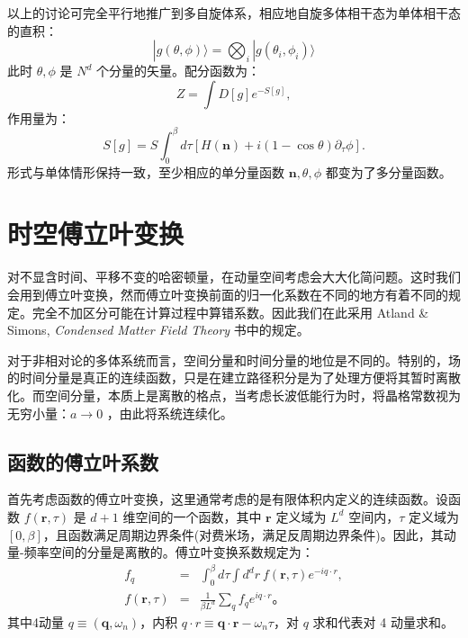 \documentclass[UTF8]{ctexart}
\begin{document}
以上的讨论可完全平行地推广到多自旋体系，相应地自旋多体相干态为单体相干态的直积：
\begin{equation}
	|g(\theta,\phi)\rangle = \bigotimes_i |g(\theta_i,\phi_i )\rangle
\end{equation}
此时 $\theta,\phi$ 是 $N^d$ 个分量的矢量。配分函数为：
\begin{equation}
	Z = \int D[g] e^{-S[g]},
\end{equation}
作用量为：
\begin{equation}
	S[g] = S\int_0^\beta d\tau \left[H(\bm n)+i(1-\cos\theta)\partial_\tau \phi \right].
\end{equation}
形式与单体情形保持一致，至少相应的单分量函数 $\bm n,\theta,\phi$ 都变为了多分量函数。




\section*{时空傅立叶变换}
\noindent 
对不显含时间、平移不变的哈密顿量，在动量空间考虑会大大化简问题。这时我们会用到傅立叶变换，然而傅立叶变换前面的归一化系数在不同的地方有着不同的规定。完全不加区分可能在计算过程中算错系数。因此我们在此采用 Atland \& Simons, \textit{Condensed Matter Field Theory} 书中的规定。

对于非相对论的多体系统而言，空间分量和时间分量的地位是不同的。特别的，场的时间分量是真正的连续函数，只是在建立路径积分是为了处理方便将其暂时离散化。而空间分量，本质上是离散的格点，当考虑长波低能行为时，将晶格常数视为无穷小量：$a \rightarrow 0$ ，由此将系统连续化。


\subsection*{函数的傅立叶系数}
\noindent 
首先考虑函数的傅立叶变换，这里通常考虑的是有限体积内定义的连续函数。设函数 $f(\bm r,\tau)$ 是 $d+1$ 维空间的一个函数，其中 $\bm r$ 定义域为 $L^d$ 空间内，$\tau$ 定义域为 $[0,\beta]$，且函数满足周期边界条件(对费米场，满足反周期边界条件)。因此，其动量-频率空间的分量是离散的。傅立叶变换系数规定为：
\begin{eqnarray}
	f_q &=& \int_0^\beta d\tau \int d^d r \ f(\bm r,\tau)e^{-iq\cdot r}, \\
	f(\bm r,\tau) &=& \frac{1}{\beta L^d} \sum_q f_q e^{i q\cdot r}。
\end{eqnarray}
其中4动量 $q\equiv(\bm q,\omega_n)$，内积 $q\cdot r \equiv \bm q\cdot \bm r - \omega_n \tau$，对 $q$ 求和代表对 4 动量求和。
\end{document}
